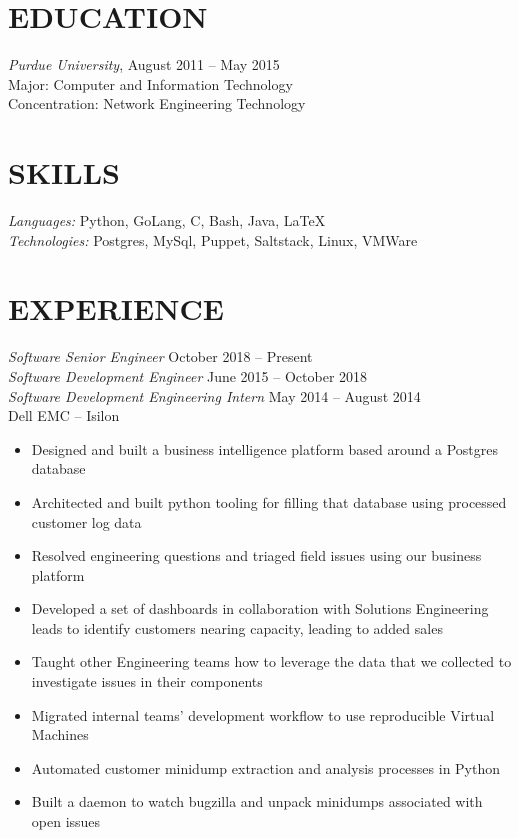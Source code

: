 \documentclass[line,margin]{res}
\begin{document}
  \name{\textcolor{TealBlue}{Ethan Madden}}
  \address{ethan@madden.ninja -- (812) 250-1419}%
  \address{2049 NW 60th St, Seattle WA 98107}

\begin{resume}
  \section{\textcolor{TealBlue}{EDUCATION}} 
    {\sl Purdue University}, \hfill August 2011 -- May 2015 \\%
      Major: Computer and Information Technology \\
      Concentration: Network Engineering Technology

  \section{\textcolor{TealBlue}{SKILLS}} 
    {\sl Languages:\/}  Python, GoLang, C, Bash, Java, \LaTeX{} \\
    {\sl Technologies:\/} Postgres, MySql, Puppet, Saltstack, Linux, VMWare

  \section{\textcolor{TealBlue}{EXPERIENCE}} 
    {\sl Software Senior Engineer\/} \hfill October 2018 -- Present \\%
    {\sl Software Development Engineer\/} \hfill June 2015 -- October 2018 \\%
    {\sl Software Development Engineering Intern\/} \hfill May 2014 -- August 2014 \\%
      Dell EMC -- Isilon %
      \begin{itemize} 
	\setlength{\itemsep}{-2pt}
        \item Designed and built a business intelligence platform based around a Postgres database
        \item Architected and built python tooling for filling that database using processed customer log data
        \item Resolved engineering questions and triaged field issues using our business platform
        \item Developed a set of dashboards in collaboration with Solutions Engineering leads to identify customers nearing capacity, leading to added sales
        \item Taught other Engineering teams how to leverage the data that we collected to investigate issues in their components
        \item Migrated internal teams' development workflow to use reproducible Virtual Machines
        \item Automated customer minidump extraction and analysis processes in Python
        \item Built a daemon to watch bugzilla and unpack minidumps associated with open issues
      \end{itemize}


\end{resume}
\end{document}
